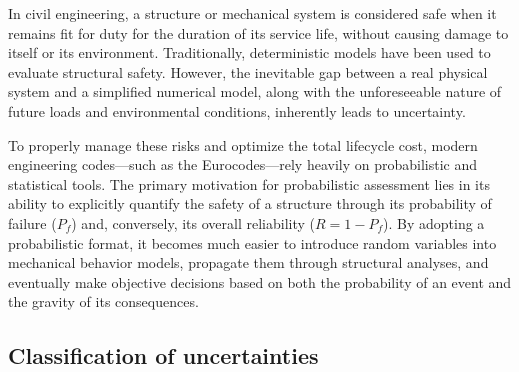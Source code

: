 \documentclass[a4paper,12pt,twoside]{report}     %
\begin{document}
In civil engineering, a structure or mechanical system is considered safe when it remains fit for duty for the duration of its service life, without causing damage to itself or its environment. Traditionally, deterministic models have been used to evaluate structural safety. However, the inevitable gap between a real physical system and a simplified numerical model, along with the unforeseeable nature of future loads and environmental conditions, inherently leads to uncertainty. 

To properly manage these risks and optimize the total lifecycle cost, modern engineering codes—such as the Eurocodes—rely heavily on probabilistic and statistical tools. The primary motivation for probabilistic assessment lies in its ability to explicitly quantify the safety of a structure through its probability of failure ($P_f$) and, conversely, its overall reliability ($R = 1 - P_f$). By adopting a probabilistic format, it becomes much easier to introduce random variables into mechanical behavior models, propagate them through structural analyses, and eventually make objective decisions based on both the probability of an event and the gravity of its consequences.


\subsection{Classification of uncertainties}
\end{document}
